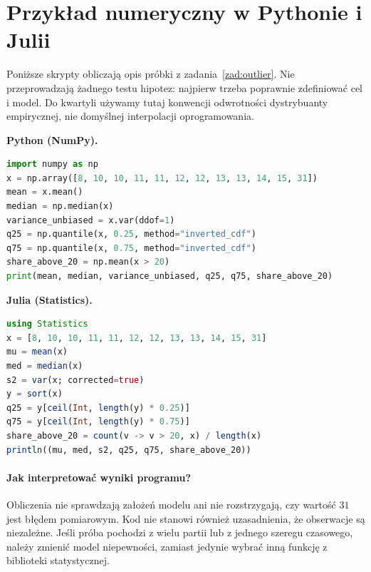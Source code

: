 \section{Przykład numeryczny w Pythonie i Julii}
Poniższe skrypty obliczają opis próbki z zadania~\ref{zad:outlier}. Nie przeprowadzają żadnego testu hipotez: najpierw trzeba poprawnie zdefiniować cel i model. Do kwartyli używamy tutaj konwencji odwrotności dystrybuanty empirycznej, nie domyślnej interpolacji oprogramowania.

\noindent\textbf{Python (NumPy).}\par
\par
{}
\smallskip
\begin{lstlisting}[language=Python,caption={Opis próby: średnia, mediana, wariancja i kwantyle (Python).}]
import numpy as np
x = np.array([8, 10, 10, 11, 11, 12, 12, 13, 13, 14, 15, 31])
mean = x.mean()
median = np.median(x)
variance_unbiased = x.var(ddof=1)
q25 = np.quantile(x, 0.25, method="inverted_cdf")
q75 = np.quantile(x, 0.75, method="inverted_cdf")
share_above_20 = np.mean(x > 20)
print(mean, median, variance_unbiased, q25, q75, share_above_20)
\end{lstlisting}

\noindent\textbf{Julia (Statistics).}\par
\par
{}
\smallskip
\begin{lstlisting}[language=Julia,caption={Opis próby z użyciem pakietu Statistics (Julia).}]
using Statistics
x = [8, 10, 10, 11, 11, 12, 12, 13, 13, 14, 15, 31]
mu = mean(x)
med = median(x)
s2 = var(x; corrected=true)
y = sort(x)
q25 = y[ceil(Int, length(y) * 0.25)]
q75 = y[ceil(Int, length(y) * 0.75)]
share_above_20 = count(v -> v > 20, x) / length(x)
println((mu, med, s2, q25, q75, share_above_20))
\end{lstlisting}

\paragraph{Jak interpretować wyniki programu?}
Obliczenia nie sprawdzają założeń modelu ani nie rozstrzygają, czy wartość $31$ jest błędem pomiarowym. Kod nie stanowi również uzasadnienia, że obserwacje są niezależne. Jeśli próba pochodzi z wielu partii lub z jednego szeregu czasowego, należy zmienić model niepewności, zamiast jedynie wybrać inną funkcję z biblioteki statystycznej.

